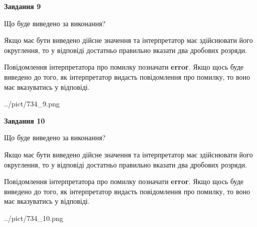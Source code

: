 \documentclass[12pt, ukrainian]{article}
\begin{document}
{\begin {Large}
{\begin {center}\textbf{Завдання 9}\end {center}}\par
Що буде виведено за виконання? \par

Якщо має бути виведено дійсне значення та інтерпретатор має здійснювати його округлення, 
то у відповіді достатньо правильно вказати два дробових розряди.

Повідомлення інтерпретатора про помилку позначати \textbf{error}.
Якщо щось буде виведено до того, як інтерпретатор видасть повідомлення про помилку, 
то воно має вказуватись у відповіді. \par

\begin{center}
	{../pict/734_9.png}
\end{center}
\newpage

{\begin {center}\textbf{Завдання 10}\end {center}}\par
Що буде виведено за виконання? \par

Якщо має бути виведено дійсне значення та інтерпретатор має здійснювати його округлення, 
то у відповіді достатньо правильно вказати два дробових розряди.

Повідомлення інтерпретатора про помилку позначати \textbf{error}.
Якщо щось буде виведено до того, як інтерпретатор видасть повідомлення про помилку, 
то воно має вказуватись у відповіді. \par

\begin{center}
	{../pict/734_10.png}
\end{center}
\newpage

\end {Large}}
\end{document}
